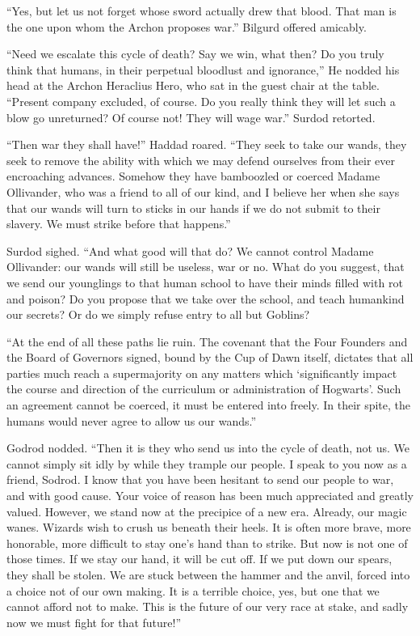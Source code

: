 “Yes, but let us not forget whose sword actually drew that blood. That man is the one upon whom the Archon proposes war.” Bilgurd offered amicably.

“Need we escalate this cycle of death? Say we win, what then? Do you truly think that humans, in their perpetual bloodlust and ignorance,” He nodded his head at the Archon Heraclius Hero, who sat in the guest chair at the table. “Present company excluded, of course. Do you really think they will let such a blow go unreturned? Of course not! They will wage war.” Surdod retorted.

“Then war they shall have!” Haddad roared. “They seek to take our wands, they seek to remove the ability with which we may defend ourselves from their ever encroaching advances. Somehow they have bamboozled or coerced Madame Ollivander, who was a friend to all of our kind, and I believe her when she says that our wands will turn to sticks in our hands if we do not submit to their slavery. We must strike before that happens.”

Surdod sighed. “And what good will that do? We cannot control Madame Ollivander: our wands will still be useless, war or no. What do you suggest, that we send our younglings to that human school to have their minds filled with rot and poison? Do you propose that we take over the school, and teach humankind our secrets? Or do we simply refuse entry to all but Goblins?

“At the end of all these paths lie ruin. The covenant that the Four Founders and the Board of Governors signed, bound by the Cup of Dawn itself, dictates that all parties much reach a supermajority on any matters which ‘significantly impact the course and direction of the curriculum or administration of Hogwarts’. Such an agreement cannot be coerced, it must be entered into freely. In their spite, the humans would never agree to allow us our wands.”

Godrod nodded. “Then it is they who send us into the cycle of death, not us. We cannot simply sit idly by while they trample our people. I speak to you now as a friend, Sodrod. I know that you have been hesitant to send our people to war, and with good cause. Your voice of reason has been much appreciated and greatly valued. However, we stand now at the precipice of a new era. Already, our magic wanes. Wizards wish to crush us beneath their heels. It is often more brave, more honorable, more difficult to stay one’s hand than to strike. But now is not one of those times. If we stay our hand, it will be cut off. If we put down our spears, they shall be stolen. We are stuck between the hammer and the anvil, forced into a choice not of our own making. It is a terrible choice, yes, but one that we cannot afford not to make. This is the future of our very race at stake, and sadly now we must fight for that future!”

